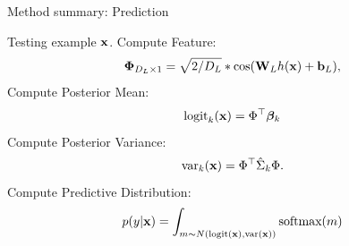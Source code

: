 \documentclass[xcolor=table]{beamer}
\begin{document}
\begin{frame}{Method summary: Prediction}


\begin{algorithm}[H]
   \caption{SNGP Prediction}
   \label{alg:prediction}
\begin{algorithmic}[1]
    Testing example ${\mathbf x}$.
   \STATE %
   Compute Feature: %
   \vspace{-0.5em}
   $${\boldsymbol{\Phi}}_{D_L \times 1} = \sqrt{2/D_L} * \cos({\mathbf W}_L h({\mathbf x}) + {\mathbf b}_L),$$ 
   \vspace{-1.2em}
   \STATE %
   Compute Posterior Mean: %
   \vspace{-0.5em}
   $$\text{logit}_k({\mathbf x})=\Phi^\top{\boldsymbol{\beta}}_k$$ 
   \vspace{-1.2em}
   \STATE %
   Compute Posterior Variance: %
   \vspace{-0.5em}
   $$\text{var}_k({\mathbf x})=\Phi^\top\hat{\Sigma}_k\Phi.$$ 
   \vspace{-1em}
      \STATE %
      Compute Predictive Distribution:\\
   \vspace{-1.5em}
   $$p(y|{\mathbf x})=\int_{m \sim N(\text{logit}({\mathbf x}), \text{var}({\mathbf x}))}{\text{softmax}(m)}$$ 
   \vspace{-1em}
\end{algorithmic}
\end{algorithm}

\end{frame}
\end{document}
